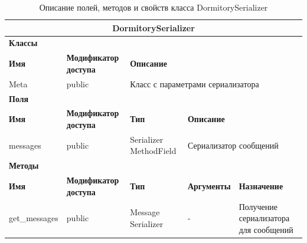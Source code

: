 \documentclass{../includes/TechDoc}
\begin{document}
    \begin{table}[ht]
        \caption{\label{tab:class-DormitorySerializer-table}Описание полей, методов и свойств класса DormitorySerializer}
        \centering
        \begin{tabular}{|p{3.2cm}|p{3cm}|p{2.9cm}|p{2.9cm}|p{4cm}|}
            \hline
            \multicolumn{5}{|c|}{DormitorySerializer} \\ \hline
            \multicolumn{5}{|l|}{\textbf{Классы}} \\ \hline
            \textbf{Имя} & \textbf{Модификатор доступа} & \multicolumn{3}{p{9.8cm}|}{\textbf{Описание}} \\ \hline
            Meta & public & \multicolumn{3}{p{9.8cm}|}{Класс с параметрами сериализатора} \\ \hline
            \multicolumn{5}{|l|}{\textbf{Поля}} \\ \hline
            \textbf{Имя} & \textbf{Модификатор доступа} & \textbf{Тип} & \multicolumn{2}{p{6.9cm}|}{\textbf{Описание}} \\ \hline
            messages & public & Serializer MethodField & \multicolumn{2}{p{6.9cm}|}{Сериализатор сообщений} \\ \hline
            \multicolumn{5}{|l|}{\textbf{Методы}} \\ \hline
            \textbf{Имя} & \textbf{Модификатор доступа} & \textbf{Тип} & \textbf{Аргументы} & \textbf{Назначение} \\ \hline
            get\_messages & public & Message Serializer & - & Получение сериализатора для сообщений \\ \hline
        \end{tabular}
    \end{table}
\end{document}
